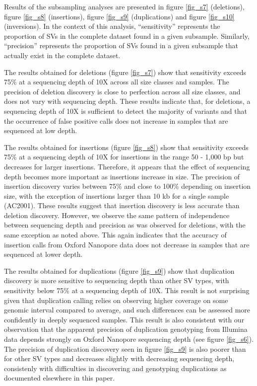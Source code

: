 \documentclass[12pt]{article}
\begin{document}
Results of the subsampling analyses are presented in figure \ref{fig_s7} (deletions), figure \ref{fig_s8} (insertions), figure \ref{fig_s9} (duplications) and figure \ref{fig_s10} (inversions).
In the context of this analysis, ``sensitivity'' represents the proportion of SVs in the complete dataset found in a given subsample.
Similarly, ``precision'' represents the proportion of SVs found in a given subsample that actually exist in the complete dataset.

The results obtained for deletions (figure \ref{fig_s7}) show that sensitivity exceeds 75\% at a sequencing depth of 10X across all size classes and samples.
The precision of deletion discovery is close to perfection across all size classes, and does not vary with sequencing depth.
These results indicate that, for deletions, a sequencing depth of 10X is sufficient to detect the majority of variants and that the occurrence of false positive calls does not increase in samples that are sequenced at low depth.

The results obtained for insertions (figure \ref{fig_s8}) show that sensitivity exceeds 75\% at a sequencing depth of 10X for insertions in the range 50 - 1,000 bp but decreases for larger insertions.
Therefore, it appears that the effect of sequencing depth becomes more important as insertions increase in size.
The precision of insertion discovery varies between 75\% and close to 100\% depending on insertion size, with the exception of insertions larger than 10 kb for a single sample (AC2001).
These results suggest that insertion discovery is less accurate than deletion discovery.
However, we observe the same pattern of independence between sequencing depth and precision as was observed for deletions, with the same exception as noted above.
This again indicates that the accuracy of insertion calls from Oxford Nanopore data does not decrease in samples that are sequenced at lower depth.

The results obtained for duplications (figure \ref{fig_s9}) show that duplication discovery is more sensitive to sequencing depth than other SV types, with sensitivity below 75\% at a sequencing depth of 10X.
This result is not surprising given that duplication calling relies on observing higher coverage on some genomic interval compared to average, and such differences can be assessed more confidently in deeply sequenced samples.
This result is also consistent with our observation that the apparent precision of duplication genotyping from Illumina data depends strongly on Oxford Nanopore sequencing depth (see figure \ref{fig_s6}).
The precision of duplication discovery seen in figure \ref{fig_s9} is also poorer than for other SV types and decreases slightly with decreasing sequencing depth, consistenly with difficulties in discovering and genotyping duplications as documented elsewhere in this paper.
\end{document}
